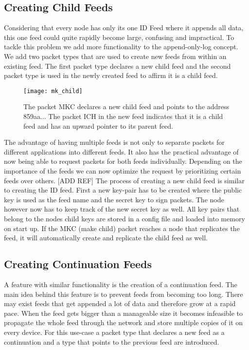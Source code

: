\subsection{Creating Child Feeds}
Considering that every node has only its one ID Feed where it appends all data, this one feed could quite rapidly become large, confusing and impractical. To tackle this problem we add more functionality to the append-only-log concept. We add two packet types that are used to create new feeds from within an existing feed. The first packet type declares a new child feed and the second packet type is used in the newly created feed to affirm it is a child feed.

\begin{figure}
\centering
\texttt{[image: mk\_child]}
\caption{The packet MKC declares a new child feed and points to the address 859aa... The packet ICH in the new feed indicates that it is a child feed and has an upward pointer to its parent feed.}
\label{fig:mk_child}
\end{figure}

The advantage of having multiple feeds is not only to separate packets for different applications into different feeds. It also has the practical advantage of now being able to request packets for both feeds individually. Depending on the importance of the feeds we can now optimize the request by prioritizing certain feeds over others. [ADD REF]
The process of creating a new child feed is similar to creating the ID feed. First a new key-pair has to be created where the public key is used as the feed name and the secret key to sign packets. The node however now has to keep track of the new secret key as well. All key pairs that belong to the nodes child keys are stored in a config file and loaded into memory on start up. If the MKC (make child) packet reaches a node that replicates the feed, it will automatically create and replicate the child feed as well.

\subsection{Creating Continuation Feeds}
A feature with similar functionality is the creation of a continuation feed. The main idea behind this feature is to prevent feeds from becoming too long. There may exist feeds that get appended a lot of data and therefore grow at a rapid pace. When the feed gets bigger than a manageable size it becomes infeasible to propagate the whole feed through the network and store multiple copies of it on every device. For this use-case a packet type that declares a new feed as a continuation and a type that points to the previous feed are introduced.

